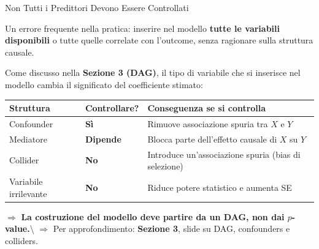 \documentclass[
  ignorenonframetext,
]{beamer}
\begin{document}
\begin{frame}{Non Tutti i Predittori Devono Essere Controllati}
\label{non-tutti-i-predittori-devono-essere-controllati}
\small

Un errore frequente nella pratica: inserire nel modello
\textbf{tutte le variabili disponibili} o tutte quelle correlate con
l'outcome, senza ragionare sulla struttura causale.

\vspace{0.4em}

Come discusso nella \textbf{Sezione 3 (DAG)}, il tipo di variabile che
si inserisce nel modello cambia il significato del coefficiente stimato:
\vspace{0.3em}

\begin{center}
\begin{tabular}{>{\footnotesize}l >{\footnotesize}l >{\footnotesize}p{4.8cm}}
\toprule
\textbf{Struttura} & \textbf{Controllare?} & \textbf{Conseguenza se si controlla} \\
\midrule
Confounder & \textbf{Sì} & Rimuove associazione spuria tra $X$ e $Y$ \\
Mediatore  & \textbf{Dipende} & Blocca parte dell'effetto causale di $X$ su $Y$ \\
Collider   & \textbf{No} & Introduce un'associazione spuria (bias di selezione) \\
Variabile irrilevante & \textbf{No} & Riduce potere statistico e aumenta SE \\
\bottomrule
\end{tabular}
\end{center}

\vspace{0.2em}

\small \(\Rightarrow\)
\textbf{La costruzione del modello deve partire da un DAG, non dai $p$-value.}\textbackslash{}
\small \(\Rightarrow\) Per approfondimento: \textbf{Sezione 3}, slide su
DAG, confounders e colliders.
\end{frame}
\end{document}
